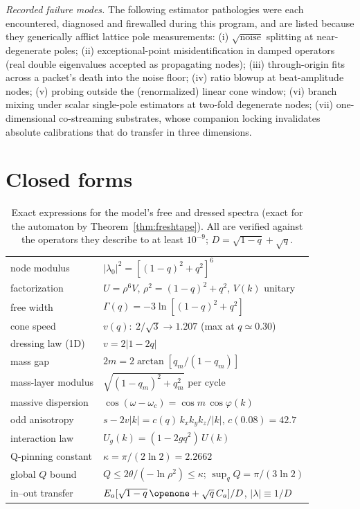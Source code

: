\documentclass[aps,prd,twocolumn,superscriptaddress,nofootinbib,floatfix]{revtex4-2}
\begin{document}
\emph{Recorded failure modes.} The following estimator pathologies were
each encountered, diagnosed and firewalled during this program, and are
listed because they generically afflict lattice pole measurements:
(i) $\sqrt{\text{noise}}$ splitting at near-degenerate poles;
(ii) exceptional-point misidentification in damped operators (real double
eigenvalues accepted as propagating nodes);
(iii) through-origin fits across a packet's death into the noise floor;
(iv) ratio blowup at beat-amplitude nodes;
(v) probing outside the (renormalized) linear cone window;
(vi) branch mixing under scalar single-pole estimators at two-fold
degenerate nodes;
(vii) one-dimensional co-streaming substrates, whose companion locking
invalidates absolute calibrations that do transfer in three dimensions.

\section{Closed forms}
\label{app:closedforms}

\begin{table}[!htb]
\caption{Exact expressions for the model's free and dressed spectra
(exact for the automaton by Theorem~\ref{thm:freshtape}). All are
verified against the operators they describe to at least
$10^{-9}$; $D=\sqrt{1-q}+\sqrt q$.}
\label{tab:closed}
\begin{ruledtabular}
\scriptsize
\begin{tabular}{ll}
node modulus & $|\lambda_0|^2=[(1-q)^2+q^2]^6$\\
factorization & $U=\rho^6V$, $\rho^2=(1-q)^2+q^2$, $V(k)$ unitary\\
free width & $\Gamma(q)=-3\ln[(1-q)^2+q^2]$\\
cone speed & $v(q)\colon\ 2/\sqrt3 \to 1.207$ (max at $q\simeq0.30$)\\
dressing law (1D) & $v=2|1-2q|$\\
mass gap & $2m=2\arctan[q_m/(1-q_m)]$\\
mass-layer modulus & $\sqrt{(1-q_m)^2+q_m^2}$ per cycle\\
massive dispersion & $\cos(\omega-\omega_c)=\cos m\,\cos\varphi(k)$\\
odd anisotropy & $s-2v|k|=c(q)\,k_xk_yk_z/|k|$, $c(0.08)=42.7$\\
interaction law & $U_g(k)=(1-2gq^2)\,U(k)$\\
Q-pinning constant & $\kappa=\pi/(2\ln2)=2.2662$\\
global $Q$ bound & $Q\le2\theta/(-\ln\rho^2)\le\kappa$;
$\sup_qQ=\pi/(3\ln2)$\\
in--out transfer & $E_a[\sqrt{1-q}\,\openone+\sqrt q\,C_a]/D$,
$|\lambda|\equiv1/D$
\end{tabular}
\end{ruledtabular}
\end{table}
\end{document}

